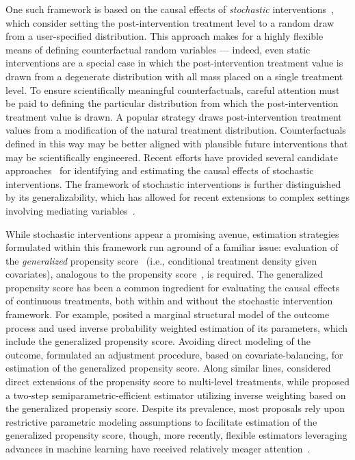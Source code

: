 One such framework is based on the causal effects of \textit{stochastic}
interventions~\citep{stock1989nonparametric, diaz2012population,
haneuse2013estimation, vanderweele2013causal, young2014identification}, which
consider setting the post-intervention treatment level to a random draw from a
user-specified distribution. This approach makes for a highly flexible means of
defining counterfactual random variables --- indeed, even static interventions
are a special case in which the post-intervention treatment value is drawn from
a degenerate distribution with all mass placed on a single treatment level. To
ensure scientifically meaningful counterfactuals, careful attention must be paid
to defining the particular distribution from which the post-intervention
treatment value is drawn. A popular strategy draws post-intervention treatment
values from a modification of the natural treatment distribution.
Counterfactuals defined in this way may be better aligned with plausible future
interventions that may be scientifically engineered. Recent efforts have
provided several candidate approaches~\citep{diaz2012population,
haneuse2013estimation, young2014identification, kennedy2019nonparametric} for
identifying and estimating the causal effects of stochastic interventions. The
framework of stochastic interventions is further distinguished by its
generalizability, which has allowed for recent extensions to complex settings
involving mediating variables~\citep{diaz2020causal, diaz2020nonparametric,
hejazi2020nonparametric}.

While stochastic interventions appear a promising avenue, estimation strategies
formulated within this framework run aground of a familiar issue: evaluation of
the \textit{generalized} propensity score~\citep{austin2018assessing} (i.e.,
conditional treatment density given covariates), analogous to the propensity
score~\citep{rosenbaum1983central}, is required. The generalized propensity
score has been a common ingredient for evaluating the causal effects of
continuous treatments, both within and without the stochastic intervention
framework. For example, \citet{robins2000marginal} posited a marginal structural
model of the outcome process and used inverse probability weighted estimation of
its parameters, which include the generalized propensity score. Avoiding direct
modeling of the outcome, \citet{hirano2004propensity} formulated an adjustment
procedure, based on covariate-balancing, for estimation of the generalized
propensity score. Along similar lines, \citet{imai2004causal} considered direct
extensions of the propensity score to multi-level treatments, while
\citet{galvao2015uniformly} proposed a two-step semiparametric-efficient
estimator utilizing inverse weighting based on the generalized propensiy score.
Despite its prevalence, most proposals rely upon restrictive parametric modeling
assumptions to facilitate estimation of the generalized propensity score,
though, more recently, flexible estimators leveraging advances in machine
learning have received relatively meager attention~\citep{diaz2011super,
zhu2015boosting}.

